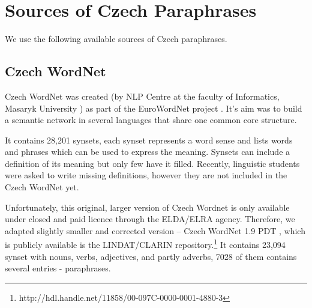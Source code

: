 %
%
%

\section{Sources of Czech Paraphrases}
We use the following available sources of Czech paraphrases.

\subsection{Czech WordNet}
Czech WordNet \citep{czech-wordnet} was created (by NLP Centre at the faculty of Informatics, Masaryk University ) as part of the EuroWordNet project . 
It's aim was to build a semantic network in several languages that share one common core structure.

It contains 28,201 synsets, each synset represents a word sense and lists words and phrases which can be used to express the meaning. 
Synsets can include a definition of its meaning but only few have it filled.
Recently, linguistic students were asked to write missing definitions, however they are not included in the Czech WordNet yet. \citep{Rambousek:2017}

Unfortunately, this original, larger version of Czech Wordnet is only available under closed and paid licence through the ELDA/ELRA agency. 
Therefore, we adapted slightly smaller and corrected version  -- Czech WordNet 1.9 PDT \citep{czech_wordnet_pdt}, which is publicly available is the LINDAT/CLARIN repository.\footnote{http://hdl.handle.net/11858/00-097C-0000-0001-4880-3} It contains 23,094 synset with nouns, verbs, adjectives, and partly adverbs, 7028 of them contains several entries - paraphrases.


